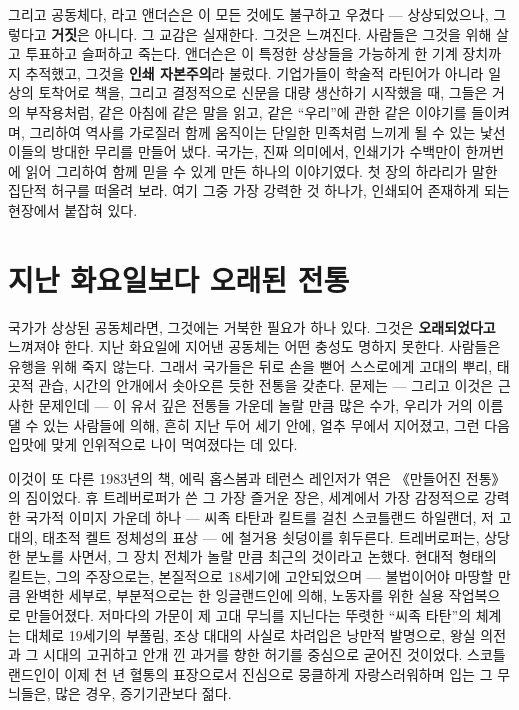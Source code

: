 그리고 공동체다, 라고 앤더슨은 이 모든 것에도 불구하고 우겼다 — 상상되었으나, 그렇다고 \textbf{거짓}은 아니다. 그 교감은 실재한다. 그것은 느껴진다. 사람들은 그것을 위해 살고 투표하고 슬퍼하고 죽는다. 앤더슨은 이 특정한 상상들을 가능하게 한 기계 장치까지 추적했고, 그것을 \textbf{인쇄 자본주의}라 불렀다. 기업가들이 학술적 라틴어가 아니라 일상의 토착어로 책을, 그리고 결정적으로 신문을 대량 생산하기 시작했을 때, 그들은 거의 부작용처럼, 같은 아침에 같은 말을 읽고, 같은 ``우리''에 관한 같은 이야기를 들이켜며, 그리하여 역사를 가로질러 함께 움직이는 단일한 민족처럼 느끼게 될 수 있는 낯선 이들의 방대한 무리를 만들어 냈다. 국가는, 진짜 의미에서, 인쇄기가 수백만이 한꺼번에 읽어 그리하여 함께 믿을 수 있게 만든 하나의 이야기였다. 첫 장의 하라리가 말한 집단적 허구를 떠올려 보라. 여기 그중 가장 강력한 것 하나가, 인쇄되어 존재하게 되는 현장에서 붙잡혀 있다.

\section*{지난 화요일보다 오래된 전통}

국가가 상상된 공동체라면, 그것에는 거북한 필요가 하나 있다. 그것은 \textbf{오래되었다고} 느껴져야 한다. 지난 화요일에 지어낸 공동체는 어떤 충성도 명하지 못한다. 사람들은 유행을 위해 죽지 않는다. 그래서 국가들은 뒤로 손을 뻗어 스스로에게 고대의 뿌리, 태곳적 관습, 시간의 안개에서 솟아오른 듯한 전통을 갖춘다. 문제는 — 그리고 이것은 근사한 문제인데 — 이 유서 깊은 전통들 가운데 놀랄 만큼 많은 수가, 우리가 거의 이름 댈 수 있는 사람들에 의해, 흔히 지난 두어 세기 안에, 얼추 무에서 지어졌고, 그런 다음 입맛에 맞게 인위적으로 나이 먹여졌다는 데 있다.

이것이 또 다른 1983년의 책, 에릭 홉스봄과 테런스 레인저가 엮은 《만들어진 전통》의 짐이었다. 휴 트레버로퍼가 쓴 그 가장 즐거운 장은, 세계에서 가장 감정적으로 강력한 국가적 이미지 가운데 하나 — 씨족 타탄과 킬트를 걸친 스코틀랜드 하일랜더, 저 고대의, 태초적 켈트 정체성의 표상 — 에 철거용 쇳덩이를 휘두른다. 트레버로퍼는, 상당한 분노를 사면서, 그 장치 전체가 놀랄 만큼 최근의 것이라고 논했다. 현대적 형태의 킬트는, 그의 주장으로는, 본질적으로 18세기에 고안되었으며 — 불법이어야 마땅할 만큼 완벽한 세부로, 부분적으로는 한 잉글랜드인에 의해, 노동자를 위한 실용 작업복으로 만들어졌다. 저마다의 가문이 제 고대 무늬를 지닌다는 뚜렷한 ``씨족 타탄''의 체계는 대체로 19세기의 부풀림, 조상 대대의 사실로 차려입은 낭만적 발명으로, 왕실 의전과 그 시대의 고귀하고 안개 낀 과거를 향한 허기를 중심으로 굳어진 것이었다. 스코틀랜드인이 이제 천 년 혈통의 표장으로서 진심으로 뭉클하게 자랑스러워하며 입는 그 무늬들은, 많은 경우, 증기기관보다 젊다.

